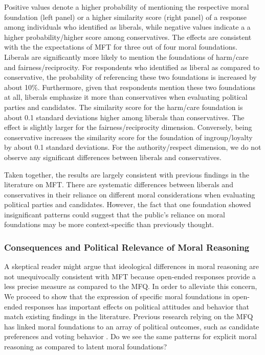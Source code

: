 \documentclass[12pt]{article}
\begin{document}
Positive values denote a higher probability of mentioning the respective moral foundation (left panel) or a higher similarity score (right panel) of a response among individuals who identified as liberals, while negative values indicate a a higher probability/higher score among conservatives. The effects are consistent with the the expectations of MFT for three out of four moral foundations. Liberals are significantly more likely to mention the foundations of harm/care and fairness/reciprocity. For respondents who identified as liberal as compared to conservative, the probability of referencing these two foundations is increased by about 10\%. Furthermore, given that respondents mention these two foundations at all, liberals emphasize it more than conservatives when evaluating political parties and candidates. The similarity score for the harm/care foundation is about 0.1 standard deviations higher among liberals than conservatives. The effect is slightly larger for the fairness/reciprocity dimension. Conversely, being conservative increases the similarity score for the foundation of ingroup/loyalty by about 0.1 standard deviations. For the authority/respect dimension, we do not observe any significant differences between liberals and conservatives.

Taken together, the results are largely consistent with previous findings in the literature on MFT. There are systematic differences between liberals and conservatives in their reliance on different moral considerations when evaluating political parties and candidates. However, the fact that one foundation showed insignificant patterns could suggest that the public's reliance on moral foundations may be more context-specific than previously thought.


\subsubsection{Consequences and Political Relevance of Moral Reasoning}

A skeptical reader might argue that ideological differences in moral reasoning are not unequivocally consistent with MFT because open-ended responses provide a less precise measure as compared to the MFQ. In order to alleviate this concern, We proceed to show that the expression of specific moral foundations in open-ended responses has important effects on political attitudes and behavior that match existing findings in the literature. Previous research relying on the MFQ has linked moral foundations to an array of political outcomes, such as candidate preferences \citep{iyer2010beyond} and voting behavior \citep{franks2015using}. Do we see the same patterns for explicit moral reasoning as compared to latent moral foundations?
\end{document}
